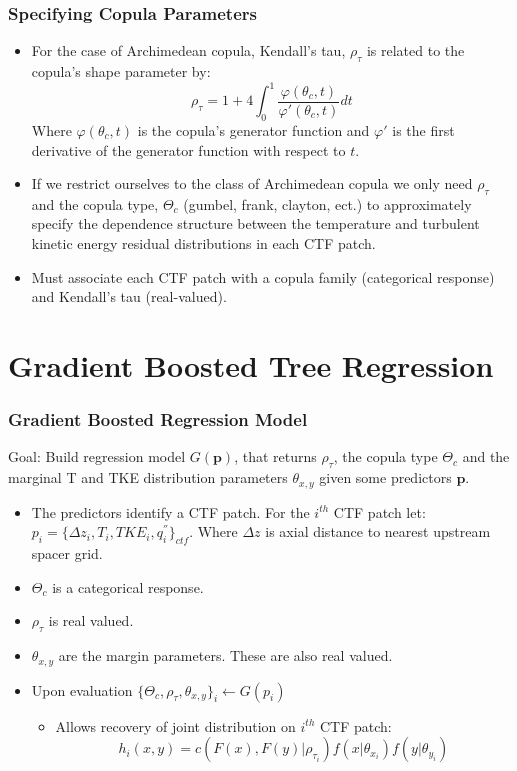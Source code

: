 \documentclass[t, pdftex]{beamer}
\begin{document}
\begin{frame}
\frametitle{Specifying Copula Parameters}
\begin{itemize}
\item For the case of Archimedean copula, Kendall's tau, $\rho_\tau$ is
related to the copula's shape parameter by:
\[
\rho_\tau = 1 + 4 \int_0^1 \frac{\varphi(\theta_c,t)}{\varphi'(\theta_c, t)}dt
\]
Where $\varphi(\theta_c, t)$ is the copula's generator function and $\varphi'$ is the first derivative of the generator function with respect to $t$.
\item  If we restrict ourselves to the class of  Archimedean copula we only need $\rho_\tau$ and the copula type, $\Theta_c$ (gumbel, frank, clayton, ect.) to approximately specify the dependence structure between the temperature and turbulent kinetic energy residual distributions in each CTF patch.
\item Must associate each CTF patch with a copula family (categorical response) and Kendall's tau (real-valued).
\end{itemize}
\end{frame}

\section{Gradient Boosted Tree Regression}
\begin{frame}
\frametitle{Gradient Boosted Regression Model}
Goal: Build regression model $G(\mathbf p)$, that returns $\rho_\tau$, the copula type $\Theta_c$ and the marginal T and TKE distribution parameters $\theta_{x,y}$ given some predictors $\mathbf p$.
\begin{itemize}
\item The predictors identify a CTF patch.  For the $i^{th}$ CTF patch let: $p_i = \{ \Delta z_i, T_i,  TKE_i, q_i^{''} \}_{ctf}$.  Where $\Delta z$ is axial distance to nearest upstream spacer grid.
\item $\Theta_c$ is a categorical response.
\item $\rho_\tau$ is real valued.
\item $\theta_{x,y}$ are the margin parameters.  These are also real valued.
\item Upon evaluation $ \{\Theta_c, \rho_\tau, \theta_{x,y}\}_i \leftarrow G(p_i)$
\begin{itemize}
\item Allows recovery of joint distribution on $i^{th}$ CTF patch:
\[
h_i(x, y) = c(F(x), F(y)|\rho_{\tau_i}) f(x|\theta_{x_i}) f(y|\theta_{y_i})
\]
\end{itemize}
\end{itemize}
\end{frame}
\end{document}

